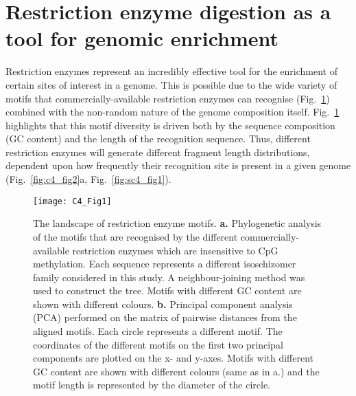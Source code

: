 \smallskip

\section{Restriction enzyme digestion as a tool for genomic enrichment}

\smallskip

Restriction enzymes represent an incredibly effective tool for the enrichment of certain sites of interest in a genome. This is possible due to the wide variety of motifs that commercially-available restriction enzymes can recognise (Fig.~\ref{fig:c4_fig1}) combined with the non-random nature of the genome composition itself. Fig.~\ref{fig:c4_fig1} highlights that this motif diversity is driven both by the sequence composition (\acrshort{GC content}) and the length of the recognition sequence. Thus, different restriction enzymes will generate different fragment length distributions, dependent upon how frequently their recognition site is present in a given genome (Fig.~\ref{fig:c4_fig2}a, Fig.~\ref{fig:sc4_fig1}).

\vspace{3.5mm}


\begin{figure}[htbp!] 
	\centering    
	\texttt{[image: C4\_Fig1]}
	\caption[The landscape of restriction enzyme motifs]{The landscape of restriction enzyme motifs. \textbf{a.} Phylogenetic analysis of the motifs that are recognised by the different commercially-available restriction enzymes which are insensitive to CpG methylation. Each sequence represents a different isoschizomer family considered in this study. A neighbour-joining method was used to construct the tree. Motifs with different GC content are shown with different colours. \textbf{b.} Principal component analysis (\acrshort{PCA}) performed on the matrix of pairwise distances from the aligned motifs. Each circle represents a different motif. The coordinates of the different motifs on the first two principal components are plotted on the x- and y-axes. Motifs with different GC content are shown with different colours (same as in a.) and the motif length is represented by the diameter of the circle.}
	\label{fig:c4_fig1}
\end{figure}


